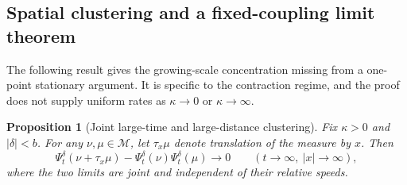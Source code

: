 \documentclass[11pt]{article}
\numberwithin{equation}{section}
\newtheorem{proposition}[theorem]{Proposition}
\theoremstyle{definition}
\theoremstyle{remark}
\begin{document}
\subsection{Spatial clustering and a fixed-coupling limit theorem}
The following result gives the growing-scale concentration missing from a one-point stationary argument. It is specific to the contraction regime, and the proof does not supply uniform rates as $\kappa\to0$ or $\kappa\to\infty$.
\begin{proposition}[Joint large-time and large-distance clustering]\label{prop:cluster}
Fix $\kappa>0$ and $|\delta|<b$. For any $\nu,\mu\in\mathcal M$, let $\tau_x\mu$ denote translation of the measure by $x$. Then
\begin{equation}\label{eq:cluster}
 \Psi_t^\delta(\nu+\tau_x\mu)-\Psi_t^\delta(\nu)\Psi_t^\delta(\mu)\longrightarrow0
 \qquad (t\to\infty,\ |x|\to\infty),
\end{equation}
where the two limits are joint and independent of their relative speeds.
\end{proposition}
\end{document}
